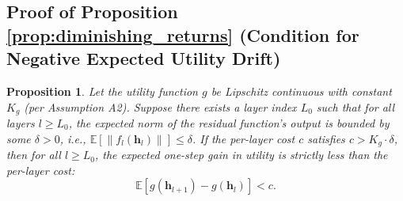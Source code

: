 \documentclass[12pt]{imsart}
\newcommand{\E}{\mathbb{E}}
\newcommand{\h}{\mathbf{h}}
\theoremstyle{plain}
\newtheorem{proposition}[theorem]{Proposition}
\theoremstyle{definition}
\begin{document}
\subsection{Proof of Proposition \ref{prop:diminishing_returns} (Condition for Negative Expected Utility Drift)}

\begin{proposition}
Let the utility function $g$ be Lipschitz continuous with constant $K_g$ (per Assumption A2). Suppose there exists a layer index $L_0$ such that for all layers $l \ge L_0$, the expected norm of the residual function's output is bounded by some $\delta > 0$, i.e., $\E[\|f_l(\h_l)\|] \le \delta$. If the per-layer cost $c$ satisfies $c > K_g \cdot \delta$, then for all $l \ge L_0$, the expected one-step gain in utility is strictly less than the per-layer cost:
\begin{equation}
\E[g(\h_{l+1}) - g(\h_l)] < c.
\end{equation}
\end{proposition}
\end{document}
